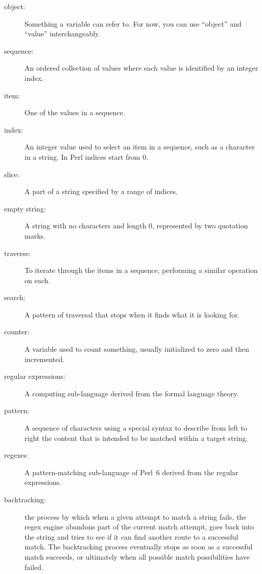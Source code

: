 \begin{description}

\item[object:] Something a variable can refer to.  For now,
you can use ``object'' and ``value'' interchangeably.

\item[sequence:] An ordered collection of
values where each value is identified by an integer index.

\item[item:] One of the values in a sequence.

\item[index:] An integer value used to select an item in
a sequence, such as a character in a string.  In Perl
indices start from 0.

\item[slice:] A part of a string specified by a range of indices.

\item[empty string:] A string with no characters and length 0, represented
by two quotation marks.

\item[traverse:] To iterate through the items in a sequence,
performing a similar operation on each.

\item[search:] A pattern of traversal that stops
when it finds what it is looking for.

\item[counter:] A variable used to count something, usually initialized
to zero and then incremented.

\item[regular expressions:] A computing sub-language derived 
from the formal language theory.

\item[pattern:] A sequence of characters using a special 
syntax to describe from left to right the content that 
is intended to be matched within a target string.

\item[regexes:] A pattern-matching sub-language of Perl~6 
derived from the regular expressions.

\item[backtracking:] the process by which when a given attempt 
to match a string fails, the regex engine abandons part of 
the current match attempt, goes back into the string and 
tries to see if it can find another route to a successful 
match. The backtracking process eventually stops as soon 
as a successful match succeeds, or ultimately when all 
possible match possibilities have failed.

\end{description}


